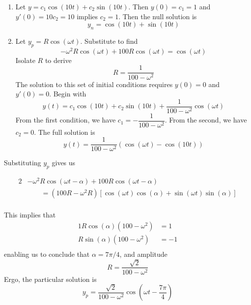 \documentclass[a4paper]{article}
\begin{document}
\begin{enumerate}[label=(\alph*)]
	\item Let \(y = c_{1} \cos\left( 10 t \right) + c_{2} \sin\left( 10 t \right)\). Then \(y \!\left( 0 \right) = c_{1} = 1\) and \(y' \!\left( 0 \right) = 10 c_{2} = 10\) implies \(c_{2} = 1\). Then the null solution is
	\[
		y_{n} = \cos\left( 10 t \right) + \sin\left( 10 t \right)
	\]
\item Let \(y_{p} = R \cos\left( \omega t \right)\). Substitute to find
	\[
		-\omega^{2} R \cos\left( \omega t \right) + 100 R \cos\left( \omega t \right) = \cos\left( \omega t \right)
	\]
	Isolate \(R\) to derive
	\[
		R = \frac{1}{100 - \omega^{2}}
	\]
	The solution to this set of initial conditions requires \(y \!\left( 0 \right) = 0 \) and \(y' \!\left( 0 \right) = 0\). Begin with
	\[
		y \!\left( t \right) = c_{1} \cos\left( 10 t \right) + c_{2} \sin\left( 10 t \right) + \frac{1}{100 - \omega^{2}} \cos\left( \omega t \right)	
	\]
	From the first condition, we have \(c_{1} = -\dfrac{1}{100 - \omega^{2}}\). From the second, we have \(c_{2} = 0\). The full solution is
	\[
		y \!\left( t \right) = \frac{1}{100 - \omega^{2}} \!\left( \cos\left( \omega t \right) - \cos\left( 10t \right) \right) 
	\]
\end{enumerate}


Substituting \(y_{p}\) gives us

\begin{alignat*}{2}
	& -\omega^{2} R \cos\left( \omega t - \alpha  \right) + 100 R \cos\left( \omega t - \alpha  \right) \\
		 & \qquad = \!\left( 100R - \omega^{2}R \right) \!\left[ \cos\left( \omega t \right)\cos\left( \alpha  \right) + \sin\left( \omega t \right)\sin\left( \alpha  \right) \right]  \\
\end{alignat*}

This implies that
\begin{alignat*}{1}
	R \cos\left( \alpha  \right) \!\left( 100 - \omega^{2} \right) & = 1 \\
	R \sin\left( \alpha  \right) \!\left( 100 - \omega^{2} \right) & = -1 \\ 
\end{alignat*}
enabling us to conclude that \(\alpha = 7 \pi / 4\), and amplitude
\[
	R = \frac{\sqrt{2}}{100 - \omega^{2}}
\]
Ergo, the particular solution is
\[
	y_{p} = \frac{\sqrt{2}}{100 - \omega^{2}} \cos\left( \omega t - \frac{7 \pi }{4} \right)
\]
\end{document}
